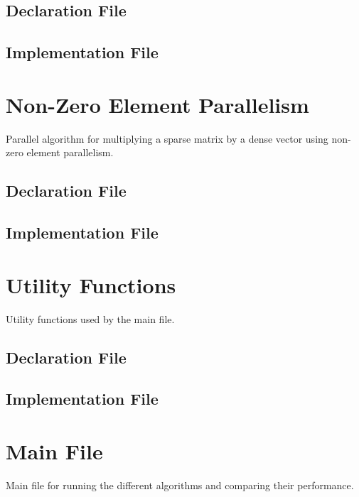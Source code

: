 \documentclass[12pt,oneside]{book} %
\begin{document}
\begin{subappendices}
    \subsection{Declaration File}
    
    \subsection{Implementation File}
    

    \section{Non-Zero Element Parallelism}\label{appendix:non-zero}
    Parallel algorithm for multiplying a sparse matrix by a dense vector using non-zero element parallelism.
    \subsection{Declaration File}
    
    \subsection{Implementation File}
    

    \section{Utility Functions}\label{appendix:utility}
    Utility functions used by the main file.
    \subsection{Declaration File}
    
    \subsection{Implementation File}
    

    \section{Main File}\label{appendix:main}
    Main file for running the different algorithms and comparing their performance.
    


\end{subappendices}
\end{document}
